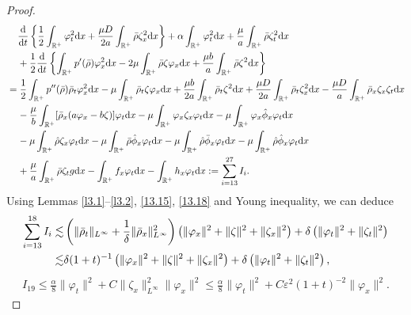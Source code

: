 \documentclass[11pt]{article}
\theoremstyle{plain}
\numberwithin{equation}{section}
\begin{document}
\begin{proof}
		\begin{align}\label{38}
			&\;\;\;\;	\frac{{\rm d}}{{\rm d}t}\left\{\frac{1}{2}\int_{\mathbb{R}^+}\varphi_t^2{\rm d}x	+\frac{\mu D}{2a}\int_{\mathbb{R}^+}^{}\bar\rho\zeta_x^2{\rm d}x\right\}+\alpha\int_{\mathbb{R}^+}\varphi_t^2{\rm d}x+\frac{\mu}{a}\int_{\mathbb{R}^+}^{}\bar\rho\zeta_t^2{\rm d}x\notag\\
			&\;\;\;\;+\frac{1}{2}	\frac{{\rm d}}{{\rm d}t}\left\{\int_{\mathbb{R}^+}p^{\prime}(\bar\rho)\varphi_x^2{\rm d}x-2\mu\int_{\mathbb{R}^+}\bar\rho\zeta\varphi_x{\rm d}x+\frac{\mu b}{a}\int_{\mathbb{R}^+}^{}\bar\rho\zeta^2{\rm d}x\right\}\notag\\
			&=\frac{1}{2}\int_{\mathbb{R}^+}p^{\prime\prime}(\bar\rho)\bar\rho_t\varphi_x^2{\rm d}x-\mu\int_{\mathbb{R}^+}\bar\rho_t\zeta\varphi_x{\rm d}x+\frac{\mu b}{2a}\int_{\mathbb{R}^+}^{}\bar\rho_t\zeta^2{\rm d}x+\frac{\mu D}{2a}\int_{\mathbb{R}^+}^{}\bar\rho_t\zeta_x^2{\rm d}x
			-\frac{\mu D}{a}\int_{\mathbb{R}^+}^{}\bar\rho_x\zeta_x\zeta_t {\rm d}x\notag\\
			&\;\;\;\;-\frac{\mu}{b}\int_{\mathbb{R}^+}[\bar\rho_x(a\varphi_x-b\zeta)]\varphi_t{\rm d}x-\mu\int_{\mathbb{R}^+}\varphi_x\zeta_x\varphi_t{\rm d}x-\mu\int_{\mathbb{R}^+}\varphi_x\hat\phi_x\varphi_t{\rm d}x\notag\\
			&\;\;\;\;	-\mu\int_{\mathbb{R}^+}\hat\rho\zeta_x\varphi_t{\rm d}x-\mu\int_{\mathbb{R}^+}\bar\rho\hat\phi_x\varphi_t{\rm d}x-\mu\int_{\mathbb{R}^+}\hat\rho\bar\phi_x\varphi_t{\rm d}x-\mu\int_{\mathbb{R}^+}\hat\rho\hat\phi_x\varphi_t{\rm d}x\notag\\
			&\;\;\;\;+\frac{\mu}{a}\int_{\mathbb{R}^+}^{}\bar\rho\zeta_tg {\rm d}x-\int_{\mathbb{R}^+}f_x\varphi_t{\rm d}x-\int_{\mathbb{R}^+}h_x\varphi_t{\rm d}x:=\sum_{i=13}^{27}I_i.
		\end{align}
		Using Lemmas \ref{l3.1}--\ref{l3.2}, \eqref{13.15}, \eqref{13.18} and Young inequality, we can deduce
		\begin{align}\label{J18}
			\sum_{i=13}^{18}I_i\lesssim&
			\left(\|\bar\rho_t\|_{L^{\infty}}+\frac{1}{\delta}\|\bar\rho_x\|_{L^{\infty}}^2\right)\left(\|\varphi_x\|^2+\|\zeta\|^2+\|\zeta_x\|^2\right)
			+\delta\left(\|\varphi_t\|^2+\|\zeta_t\|^2\right)
			\notag\\
			\lesssim&\delta(1+t)^{-1}\left(\|\varphi_x\|^2+\|\zeta\|^2+\|\zeta_x\|^2\right)
			+\delta\left(\|\varphi_t\|^2+\|\zeta_t\|^2\right),
		\end{align}
		\begin{align}\label{K9}
			I_{19}\leq \frac{\alpha}{8}\|\varphi_t\|^2+C\|\zeta_x\|_{L^{\infty}}^2\|\varphi_x\|^2\leq \frac{\alpha}{8}\|\varphi_t\|^2+C\varepsilon^2(1+t)^{-2}\|\varphi_x\|^2.

\end{align}
\end{proof}
\end{document}
